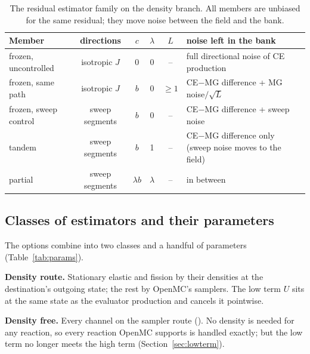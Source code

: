 \begin{table}[t]\centering\small
\begin{tabularx}{\textwidth}{lccccX}
\toprule
Member & directions & $c$ & $\lambda$ & $L$ & noise left in the bank\\
\midrule
frozen, uncontrolled & isotropic $J$ & 0 & 0 & -- & full directional noise of CE production\\
frozen, same path & isotropic $J$ & $b$ & 0 & $\ge1$ & CE$-$MG difference + MG noise$/\sqrt L$\\
frozen, sweep control & sweep segments & $b$ & 0 & -- & CE$-$MG difference + sweep noise\\
tandem & sweep segments & $b$ & 1 & -- & CE$-$MG difference only (sweep noise moves to the field)\\
partial & sweep segments & $\lambda b$ & $\lambda$ & -- & in between\\
\bottomrule
\end{tabularx}
\caption{The residual estimator family on the density branch. All members are unbiased for the same
residual; they move noise between the field and the bank.}\label{tab:family}
\end{table}

\subsection{Classes of estimators and their parameters}\label{sec:classes}

The options combine into two classes and a handful of parameters (Table~\ref{tab:params}).

\textbf{Density route.} Stationary elastic and fission by their densities at the destination's
outgoing state; the rest by OpenMC's samplers. The low term $U$ sits at the same state as the
evaluator production and cancels it pointwise.

\textbf{Density free.} Every channel on the sampler route (). No density is needed
for any reaction, so every reaction OpenMC supports is handled exactly; but the low term no longer
meets the high term (Section~\ref{sec:lowterm}).

